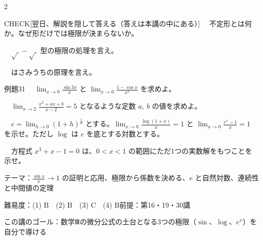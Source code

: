 \documentclass[paper=b5j, fontsize=8pt, fleqn, twoside]{jlreq}
\begin{document}
\begin{multicols*}{2}
  \begin{ptbs}{CHECK}[翌日、解説を隠して答える（答えは本講の中にある）]
    　不定形とは何か。なぜ形だけでは極限が決まらないか。\par
    　$\sqrt{\ }-\sqrt{\ }$ 型の極限の処理を言え。\par
    　はさみうちの原理を言え。
  \end{ptbs}

  \notefill
\end{multicols*}

\begin{ascolorbox4A}[出典：オリジナル]{例題31}
  　$\displaystyle\lim_{x\to0}\frac{\sin3x}x$ と $\displaystyle\lim_{x\to0}\frac{1-\cos x}{x^2}$ を求めよ。\par
  　$\displaystyle\lim_{x\to2}\frac{x^2+ax+b}{x-2}=5$ となるような定数 $a,\ b$ の値を求めよ。\par
  　$e=\displaystyle\lim_{h\to0}(1+h)^{\frac1h}$ とする。$\displaystyle\lim_{x\to0}\frac{\log(1+x)}x=1$ と $\displaystyle\lim_{x\to0}\frac{e^x-1}x=1$ を示せ。ただし $\log$ は $e$ を底とする対数とする。\par
  　方程式 $x^3+x-1=0$ は、$0<x<1$ の範囲にただ1つの実数解をもつことを示せ。
\end{ascolorbox4A}

\begin{Data}
  テーマ：$\frac{\sin x}x\to1$ の証明と応用、極限から係数を決める、$e$ と自然対数、連続性と中間値の定理\par
  難易度：(1) B　(2) B　(3) C　(4) B\quad 前提：第16・19・30講\par
  この講のゴール：数学Ⅲの微分公式の土台となる3つの極限（$\sin$、$\log$、$e^x$）を自分で導ける
\end{Data}
\end{document}
